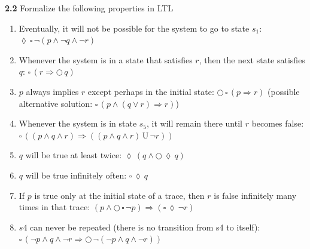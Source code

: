 \documentclass{article}
\def\unt{\, \text{U} \,}
\def\nex{\bigcirc \,}
\def\evt{\lozenge  \,}
\def\alw{\square \,}
\begin{document}
\textbf{2.2} Formalize the following properties in LTL
\begin{enumerate}
    \item Eventually, it will not be possible for the system to go to state $s_1$: $\evt \alw \lnot (p \land \lnot q \land \lnot r)$
    \item Whenever the system is in a state that satisfies $r$, then the next state satisfies $q$: $\alw (r \Rightarrow \nex q)$
    \item $p$ always implies $r$ except perhaps in the initial state: $\nex \alw (p \Rightarrow r)$ (possible alternative solution: $\alw(p \land (q \lor r)\Rightarrow r)$)
    \item Whenever the system is in state $s_5$, it will remain there until $r$ becomes false: $\alw ((p \land q \land r ) \Rightarrow ((p \land q \land r) \unt \lnot r) )$
    \item $q$ will be true at least twice: $\evt(q \land \nex \evt q)$
    \item $q$ will be true infinitely often: $\alw \evt q$
    \item If $p$ is true only at the initial state of a trace, then $r$ is false infinitely many times in that trace: $(p \land \nex\alw \lnot p) \Rightarrow (\alw \evt \lnot r)$
    \item $s4$ can never be repeated (there is no transition from s4 to itself): $\alw(\lnot p \land q \land \lnot r \Rightarrow \nex \lnot (\lnot p \land q \land \lnot r))$
\end{enumerate}
\end{document}
